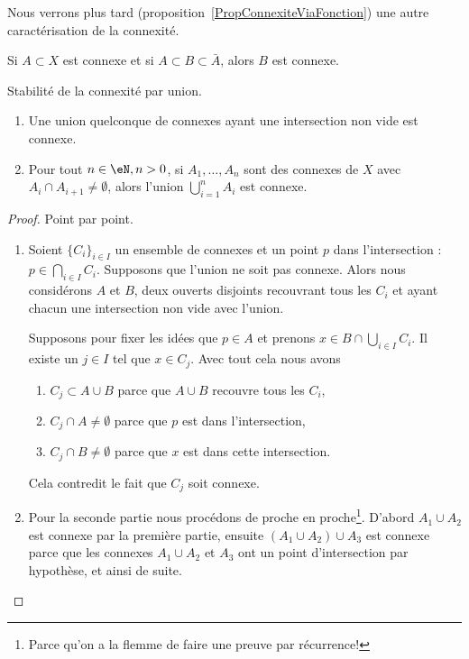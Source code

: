 Nous verrons plus tard (proposition~\ref{PropConnexiteViaFonction}) une autre caractérisation de la connexité.

\begin{proposition}
    Si \( A\subset X\) est connexe et si \( A\subset B\subset \bar A\), alors \( B\) est connexe.
\end{proposition}

\begin{proposition} \label{PropIWIDzzH}
    Stabilité de la connexité par union.
    \begin{enumerate}
        \item
    Une union quelconque de connexes ayant une intersection non vide est connexe.
\item
    Pour tout \( n \in \eN, n > 0 \), si \( A_1,\ldots, A_n\) sont des connexes de \( X\) avec \( A_i\cap A_{i+1}\neq \emptyset\), alors l'union \( \bigcup_{i=1}^nA_i\) est connexe.
    \end{enumerate}
\end{proposition}

\begin{proof}
    Point par point.
    \begin{enumerate}
        \item
    Soient \( \{ C_i \}_{i\in I}\) un ensemble de connexes et un point \( p\) dans l'intersection : \( p\in\bigcap_{i\in I}C_i\). Supposons que l'union ne soit pas connexe. Alors nous considérons \( A\) et \( B\), deux ouverts disjoints recouvrant tous les \( C_i\) et ayant chacun une intersection non vide avec l'union.

    Supposons pour fixer les idées que \( p\in A\) et prenons \( x\in B\cap\bigcup_{i\in I}C_i\). Il existe un \( j\in I\) tel que \( x\in C_j\). Avec tout cela nous avons
    \begin{enumerate}
        \item
            \( C_j\subset A\cup B\) parce que \(A \cup B\) recouvre tous les \( C_i \),
        \item
            \( C_j\cap A\neq \emptyset\) parce que \( p\) est dans l'intersection,
        \item
            \( C_j\cap B\neq\emptyset\) parce que \( x\) est dans cette intersection.
    \end{enumerate}
    Cela contredit le fait que \( C_j\) soit connexe.

\item

    Pour la seconde partie nous procédons de proche en proche\footnote{Parce qu'on a la flemme de faire une preuve par récurrence!}. D'abord \( A_1\cup A_2\) est connexe par la première partie, ensuite \( (A_1\cup A_2)\cup A_3\) est connexe parce que les connexes \( A_1\cup A_2\) et \( A_3\) ont un point d'intersection par hypothèse, et ainsi de suite.
    \end{enumerate}
\end{proof}


